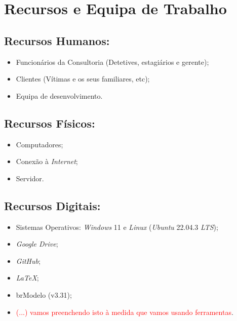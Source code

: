 \documentclass[a4paper,12pt]{scrreprt}
\begin{document}
    \section{Recursos e Equipa de Trabalho}
        \subsection{Recursos Humanos:}
            \begin{itemize}
                \item Funcionários da Consultoria (Detetives, estagiários e gerente);
                \item Clientes (Vítimas e os seus familiares, etc);
                \item Equipa de desenvolvimento.
            \end{itemize}
        \subsection{Recursos Físicos:}
            \begin{itemize}
                \item Computadores;
                \item Conexão à \textit{Internet};
                \item Servidor.
            \end{itemize}
        \subsection{Recursos Digitais:}
            \begin{itemize}
                \item Sistemas Operativos: \textit{Windows} 11 e \textit{Linux} (\textit{Ubuntu} 22.04.3 \textit{LTS});
                \item \textit{Google Drive};
                \item \textit{GitHub};
                \item \textit{LaTeX};
                \item brModelo (v3.31);
                \item \textcolor{red}{(...) vamos preenchendo isto à medida que vamos usando ferramentas}.
            \end{itemize}
\end{document}
